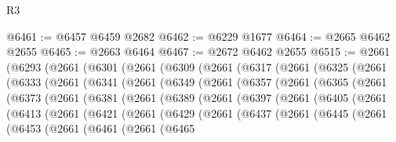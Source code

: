 \begin{lexlean}{R3}
\begin{coremodule}
@6461 := @6457 @6459 @2682
@6462 := @6229 @1677
@6464 := @2665 @6462 @2655
@6465 := @2663 @6464
@6467 := @2672 @6462 @2655
@6515 := @2661
    (@6293
      (@2661
        (@6301
          (@2661
            (@6309
              (@2661
                (@6317
                  (@2661
                    (@6325
                      (@2661
                        (@6333
                          (@2661
                            (@6341
                              (@2661
                                (@6349
                                  (@2661
                                    (@6357
                                      (@2661
                                        (@6365
                                          (@2661
                                            (@6373
                                              (@2661
                                                (@6381
                                                  (@2661
                                                    (@6389
                                                      (@2661
                                                        (@6397
                                                          (@2661
                                                            (@6405
                                                              (@2661
                                                                (@6413
                                                                  (@2661
                                                                    (@6421
                                                                      (@2661
                                                                        (@6429
                                                                          (@2661
                                                                            (@6437
                                                                              (@2661
                                                                                (@6445
                                                                                  (@2661
                                                                                    (@6453
                                                                                      (@2661
                                                                                        (@6461
                                                                                          (@2661
                                                                                            (@6465

\end{coremodule}
\end{lexlean}
